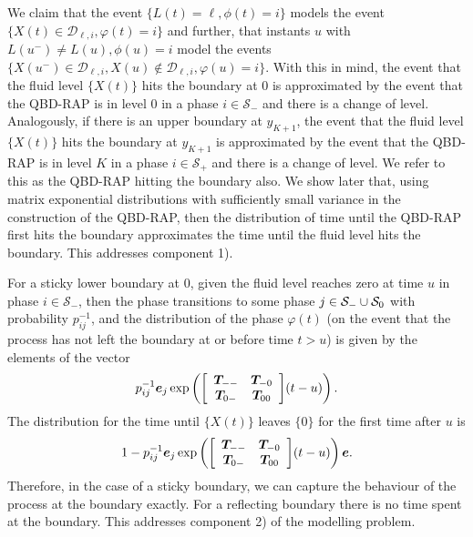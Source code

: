 We claim that the event \(\{L(t)=\ell,\phi(t)=i\}\) models the event \(\{X(t)\in\mathcal D_{\ell,i},\varphi(t)=i\}\) and further, that instants \(u\) with \(L(u^-)\neq L(u), \phi(u)=i\) model the events \(\{X(u^-)\in{}\mathcal D_{\ell,i}, X(u)\notin\mathcal D_{\ell,i},\varphi(u)=i\}\). With this in mind, the event that the fluid level \(\{X(t)\}\) hits the boundary at \(0\) is approximated by the event that the QBD-RAP is in level \(0\) in a phase \(i\in\mathcal S_-\) and there is a change of level. Analogously, if there is an upper boundary at \(y_{K+1}\), the event that the fluid level \(\{X(t)\}\) hits the boundary at \(y_{K+1}\) is approximated by the event that the QBD-RAP is in level \(K\) in a phase \(i\in\mathcal S_+\) and there is a change of level. We refer to this as the QBD-RAP hitting the boundary also. We show later that, using matrix exponential distributions with sufficiently small variance in the construction of the QBD-RAP, then the distribution of time until the QBD-RAP first hits the boundary approximates the time until the fluid level hits the boundary. This addresses component 1). 


For a sticky lower boundary at \(0\), given the fluid level reaches zero at time \(u\) in phase \(i\in\mathcal S_-\), then the phase transitions to some phase \(j\in\mathcal{S}_-\cup\mathcal{S}_0\) with probability \(p_{ij}^{-1}\), and the distribution of the phase \(\varphi(t)\) (on the event that the process has not left the boundary at or before time \(t>u\)) is given by the elements of the vector
\[p_{ij}^{-1} \boldsymbol e_j \exp\left({\left[\begin{array}{cc} \boldsymbol T_{--} & \boldsymbol T_{-0} \\ \boldsymbol T_{0-} & \boldsymbol T_{00}\end{array}\right]}(t-u)\right).\] 
The distribution for the time until \(\{X(t)\}\) leaves \(\{0\}\) for the first time after \(u\) is 
\[1-p_{ij}^{-1}\boldsymbol e_j \exp\left({\left[\begin{array}{cc} \boldsymbol T_{--} & \boldsymbol T_{-0} \\ \boldsymbol T_{0-} & \boldsymbol T_{00}\end{array}\right]}(t-u)\right)\boldsymbol e.\] 
Therefore, in the case of a sticky boundary, we can capture the behaviour of the process at the boundary exactly. For a reflecting boundary there is no time spent at the boundary. This addresses component 2) of the modelling problem. 

